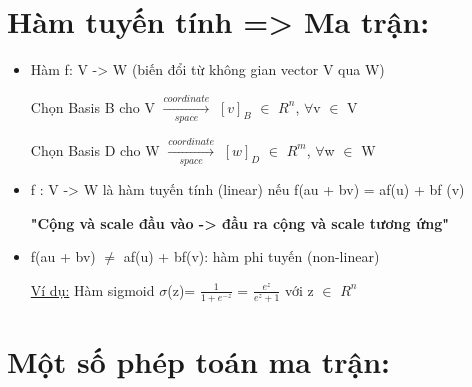 \documentclass{article}
\begin{document}
\section{Hàm tuyến tính => Ma trận: }
\begin{itemize}
    \item Hàm f: V -> W (biến đổi từ không gian vector V qua W)
    
    Chọn Basis B cho V $\xrightarrow[space]{coordinate}$ $[v]_{B}$ $\in$ $R^{n}$, $\forall$v $\in$ V
    
    Chọn Basis D cho W $\xrightarrow[space]{coordinate}$ $[w]_{D}$ $\in$ $R^{m}$, $\forall$w $\in$ W
    
    \item f : V -> W là hàm tuyến tính (linear) nếu f(au + bv) = af(u) + bf (v)
    
    \textbf{"Cộng và scale đầu vào -> đầu ra cộng và scale tương ứng"}
    \item f(au + bv) $\neq$ af(u) + bf(v): hàm phi tuyến (non-linear)
    
    \underline{Ví dụ:} Hàm sigmoid $\sigma$(z)= $\frac{1}{1+e^{-z}}$ = $\frac{e^{z}}{e^{z}+1}$
    với z $\in$ $R^{n}$

\end{itemize}

\section{Một số phép toán ma trận: }
\end{document}
